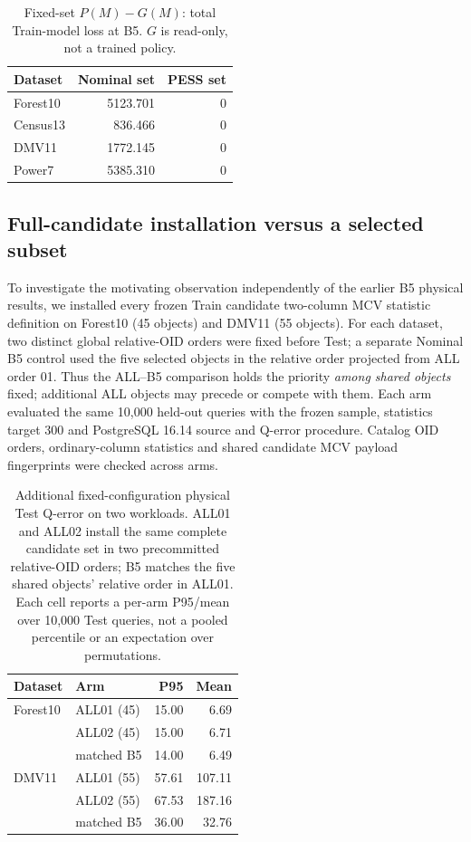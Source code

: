 \documentclass[sigconf, nonacm]{acmart}
\begin{document}
\begin{table}[t]
\caption{Fixed-set \(P(M)-G(M)\): total Train-model
loss at B5. \(G\) is read-only, not a trained policy.}
\label{tab:gap}
\centering\small
\begin{tabular}{@{}lrr@{}}
\toprule
Dataset & Nominal set & PESS set\\
\midrule
Forest10 & 5123.701 & 0\\
Census13 & 836.466 & 0\\
DMV11 & 1772.145 & 0\\
Power7 & 5385.310 & 0\\
\bottomrule
\end{tabular}
\end{table}

\subsection{Full-candidate installation versus a selected subset}
\label{sec:all-versus-selected}
To investigate the motivating observation independently of the
earlier B5 physical results, we installed every frozen Train
candidate two-column MCV statistic definition on Forest10
(45 objects) and DMV11 (55 objects). For each dataset, two
distinct global relative-OID orders were fixed before Test;
a separate Nominal B5 control used the five selected objects
in the relative order projected from ALL order 01.
Thus the ALL--B5 comparison holds the priority \emph{among
shared objects} fixed; additional ALL objects may precede or
compete with them. Each arm evaluated the same 10,000 held-out
queries with the frozen sample, statistics target 300 and
PostgreSQL 16.14 source and Q-error procedure.
Catalog OID orders, ordinary-column statistics and shared
candidate MCV payload fingerprints were checked across arms.

\begin{table}[t]
\caption{Additional fixed-configuration physical Test Q-error
on two workloads. ALL01 and ALL02 install the same complete
candidate set in two precommitted relative-OID orders;
B5 matches the five shared objects' relative order in ALL01.
Each cell reports a per-arm P95/mean over 10,000 Test queries,
not a pooled percentile or an expectation over permutations.}
\label{tab:all-b5}
\centering\small
\begin{tabular}{@{}llrr@{}}
\toprule
Dataset & Arm & P95 & Mean \\
\midrule
Forest10 & ALL01 (45) & 15.00 & 6.69 \\
         & ALL02 (45) & 15.00 & 6.71 \\
         & matched B5 & 14.00 & 6.49 \\
DMV11    & ALL01 (55) & 57.61 & 107.11 \\
         & ALL02 (55) & 67.53 & 187.16 \\
         & matched B5 & 36.00 & 32.76 \\
\bottomrule
\end{tabular}
\end{table}
\end{document}
